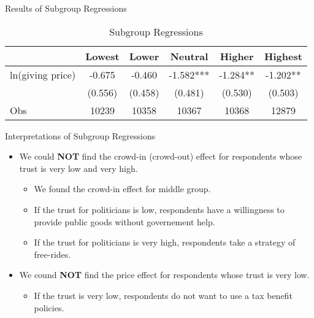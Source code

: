 \documentclass[
  ignorenonframetext,
]{beamer}
\providecommand{\tightlist}{%
  \setlength{\itemsep}{0pt}\setlength{\parskip}{0pt}}
\begin{document}
\begin{frame}{Results of Subgroup Regressions}
\protect\hypertarget{results-of-subgroup-regressions}{}
\begin{table}

\caption{\label{tab:kableTabTrustGroupReg}Subgroup Regressions}
\centering
\fontsize{9}{11}\selectfont
\begin{tabular}[t]{lccccc}
\toprule
 & Lowest & Lower & Neutral & Higher & Highest\\
\midrule
ln(giving price) & -0.675 & -0.460 & -1.582*** & -1.284** & -1.202**\\
 & (0.556) & (0.458) & (0.481) & (0.530) & (0.503)\\
Obs & 10239 & 10358 & 10367 & 10368 & 12879\\
\bottomrule
\end{tabular}
\end{table}
\end{frame}

\begin{frame}{Interpretations of Subgroup Regressions}
\protect\hypertarget{interpretations-of-subgroup-regressions}{}
\begin{itemize}
\tightlist
\item
  We could \textbf{NOT} find the crowd-in (crowd-out) effect for
  respondents whose trust is very low and very high.

  \begin{itemize}
  \tightlist
  \item
    We found the crowd-in effect for middle group.
  \item
    If the trust for politicians is low, respondents have a willingness
    to provide public goods without governement help.
  \item
    If the trust for politicians is very high, respondents take a
    strategy of free-rides.
  \end{itemize}
\item
  We cound \textbf{NOT} find the price effect for respondents whose
  trust is very low.

  \begin{itemize}
  \tightlist
  \item
    If the trust is very low, respondents do not want to use a tax
    benefit policies.
  \end{itemize}
\end{itemize}
\end{frame}
\end{document}

